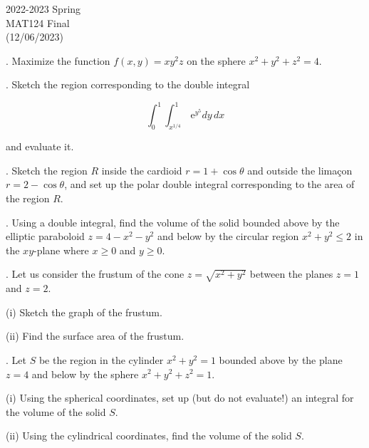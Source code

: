 \documentclass{article}
\begin{document}
\large

\begin{center}
2022-2023 Spring \\MAT124 Final\\(12/06/2023)
\end{center}

. Maximize the function $f(x,y)=xy^2z$ on the sphere $x^2+y^2+z^2 = 4$.

\hfill

. Sketch the region corresponding to the double integral

\begin{equation*}\int_0^1\int_{x^{1/4}}^1\,\mathrm{e}^{y^5}dy\,dx\end{equation*}

\hfill

\noindent and evaluate it.

\hfill

. Sketch the region $R$ inside the cardioid $r=1+\cos\theta$ and outside the limaçon $r=2-\cos\theta$, and set up the polar double integral corresponding to the area of the region $R$.

\hfill

. Using a double integral, find the volume of the solid bounded above by the elliptic paraboloid $z=4-x^2-y^2$ and below by the circular region $x^2+y^2\leq2$ in the $xy$-plane where $x\geq0$ and $y\geq0$.

\hfill

. Let us consider the frustum of the cone $z=\sqrt{x^2+y^2}$ between the planes $z=1$ and $z=2$.

\hfill

\noindent (i) Sketch the graph of the frustum.

\hfill

\noindent (ii) Find the surface area of the frustum.

\hfill

. Let $S$ be the region in the cylinder $x^2+y^2 = 1$ bounded above by the plane $z=4$ and below by the sphere $x^2+y^2+z^2=1$.

\hfill

\noindent (i) Using the spherical coordinates, set up (but do not evaluate!) an integral for the volume of the solid $S$.

\hfill

\noindent (ii) Using the cylindrical coordinates, find the volume of the solid $S$.
\end{document}
